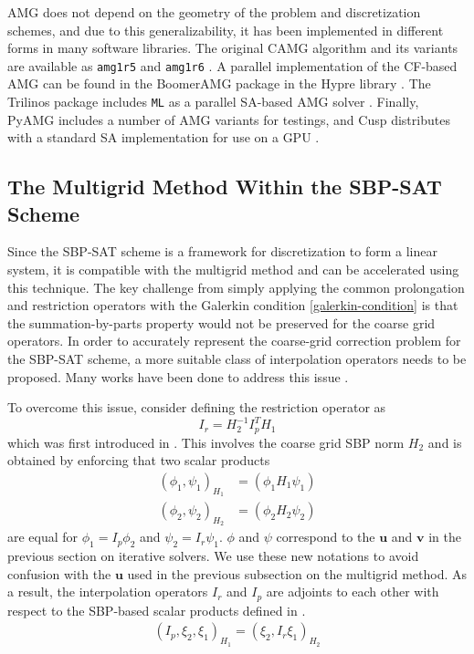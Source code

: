 AMG does not depend on the geometry of the problem and discretization schemes, and due to this generalizability, it has been implemented in different forms in many software libraries. The original CAMG algorithm and its variants are available as \texttt{amg1r5} and \texttt{amg1r6} \citep{ruge1987algebraic}. A parallel implementation of the CF-based AMG can be found in the BoomerAMG package in the Hypre library \citep{yang2002boomeramg}. The Trilinos package includes \texttt{ML} as a parallel SA-based AMG solver \citep{gee2006ml}. Finally, PyAMG includes a number of AMG variants for testings, and Cusp distributes with a standard SA implementation for use on a GPU \citep{dalton2014cusp,bell2022pyamg}. 

\subsection{The Multigrid Method Within the SBP-SAT Scheme}
Since the SBP-SAT scheme is a framework for discretization to form a linear system, it is compatible with the multigrid method and can be accelerated using this technique. The key challenge from simply applying the common prolongation and restriction operators with the Galerkin condition \autoref{galerkin-condition} is that the summation-by-parts property would not be preserved for the coarse grid operators. In order to accurately represent the coarse-grid correction problem for the SBP-SAT scheme, a more suitable class of interpolation operators needs to be proposed. Many works have been done to address this issue \citep{ruggiu2018new,RUGGIU2018216}.

To overcome this issue, consider defining the restriction operator as 
\begin{equation}
    I_r = H_2^{-1}I_p^TH_1
    \label{eqn:interpolation_sbp}
\end{equation}
which was first introduced in \citep{RUGGIU2018216}. This involves the coarse grid SBP norm $H_2$ and is obtained by enforcing that two scalar products
\begin{align}
    (\phi_1,\psi_1)_{H_1} &= (\phi_1H_1\psi_1) \\
     (\phi_2,\psi_2)_{H_2} &= (\phi_2H_2\psi_2)
\end{align}
are equal for $\phi_1 = I_p\phi_2$ and $\psi_2 = I_r \psi_1$. $\phi$ and $\psi$ correspond to the $\boldsymbol{u}$ and $\boldsymbol{v}$ in the previous section on iterative solvers. We use these new notations to avoid confusion with the $\mathbf{u}$ used in the previous subsection on the multigrid method. As a result, the interpolation operators $I_r$ and $I_p$ are adjoints to each other with respect to the SBP-based scalar products defined in \citep{hackbusch2013multi}.
\begin{align}
    (I_p,\xi_2,\xi_1)_{H_1} = (\xi_2,I_r\xi_1)_{H_2}
    \label{eqn:adjoint}
\end{align}

